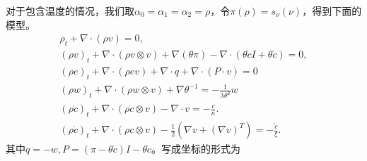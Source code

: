 \documentclass{article}
\begin{document}
	对于包含温度的情况，我们取$\alpha_0=\alpha_1=\alpha_2=\rho$，令$\pi(\rho) = s_\nu(\nu)$，得到下面的模型。
	\begin{subequations}\label{eq:CDFTemp}
		\begin{align}
			\rho_t + \nabla \cdot (\rho v) = 0, \\
			(\rho v)_t + \nabla \cdot (\rho v \otimes v) + \nabla (\theta \pi) - \nabla \cdot ( \theta \dot{c} I + \theta \mathring{c}) = 0, \\
			(\rho  e)_t + \nabla \cdot (\rho e v) + \nabla \cdot q + \nabla \cdot (P \cdot v) = 0\\
			(\rho w)_t + \nabla \cdot (\rho w \otimes v) + \nabla \theta^{-1} = - \frac{1}{\lambda \theta^2} w \\
			(\rho \dot{c})_t  + \nabla \cdot(\rho \dot{c} \otimes v) -  \nabla \cdot v = - \frac{\dot{c}}{\kappa}. \\
			(\rho \mathring{c})_t + \nabla \cdot (\rho c \otimes v) - \frac{1}{2} (\nabla v + (\nabla v)^T) = - \frac{ \mathring{c}}{\xi}.
		\end{align}
	\end{subequations}
其中$q= -w,P = (\pi - \theta \dot{c}) I - \theta \mathring{c}$。写成坐标的形式为
\end{document}
